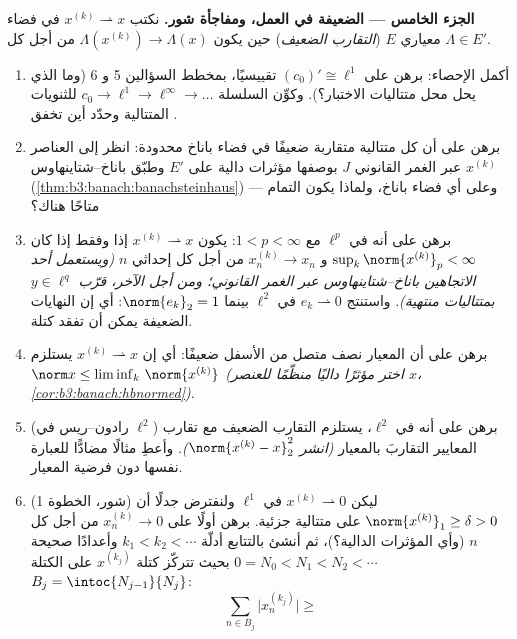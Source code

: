 \begin{problem}[{مسألة نهاية الأسبوع --- $(\ell^p)' = \ell^q$، والانعكاسية،
وغرابة $\ell^\infty$}]
\medskip
\noindent\textbf{الجزء الخامس ---  الضعيفة في
العمل، ومفاجأة شور.} نكتب $x^{(k)} \rightharpoonup x$ في فضاء معياري $E$
(\emph{التقارب الضعيف}) حين يكون $\Lambda(x^{(k)}) \to \Lambda(x)$ من أجل كل
$\Lambda \in E'$.
\begin{enumerate}[resume]
  \item أكمل الإحصاء: برهن على $(c_0)' \cong \ell^1$ تقييسيًا، بمخطط
        السؤالين 5 و 6 (وما الذي يحل محل متتاليات الاختبار؟).
        وكوِّن السلسلة $c_0 \to \ell^1 \to \ell^\infty \to \dots$ للثنويات المتتالية وحدّد أين
        تخفق .
  \item برهن على أن كل متتالية متقاربة ضعيفًا في فضاء باناخ
        محدودة: انظر إلى العناصر $x^{(k)}$ عبر الغمر القانوني
        $J$ بوصفها مؤثرات دالية على $E'$ وطبّق
        باناخ--شتاينهاوس (\cref{thm:b3:banach:banachsteinhaus}) --- وعلى أي فضاء باناخ،
        ولماذا يكون التمام متاحًا هناك؟
  \item برهن على أنه في $\ell^p$ مع $1 < p < \infty$: يكون
        $x^{(k)}
        \rightharpoonup x$ إذا وفقط إذا كان $\sup_k\norm{x^{(k)}}_p <
        \infty$ و $x^{(k)}_n \to x_n$ من أجل كل
        إحداثي $n$ \emph{(ويستعمل أحد الاتجاهين
        باناخ--شتاينهاوس عبر الغمر القانوني؛ ومن أجل الآخر،
        قرّب $y
        \in \ell^q$ بمتتاليات منتهية)}. واستنتج $e_k
        \rightharpoonup 0$ في
        $\ell^2$ بينما $\norm{e_k}_2 =
        1$: أي إن النهايات الضعيفة يمكن أن
        تفقد كتلة.
  \item برهن على أن المعيار نصف متصل من الأسفل ضعيفًا: أي إن
        $x^{(k)} \rightharpoonup x$ يستلزم $\norm x \leq
        \liminf_k\,\norm{x^{(k)}}$ \emph{(اختر مؤثرًا داليًا منظّمًا
        للعنصر $x$، \cref{cor:b3:banach:hbnormed})}.
  \item (رادون--ريس في $\ell^2$) برهن على أنه في $\ell^2$، يستلزم
        التقارب الضعيف مع تقارب المعايير التقاربَ بالمعيار
        \emph{(انشر $\norm{x^{(k)} -
        x}_2^2$)}. وأعطِ مثالًا مضادًّا للعبارة
        نفسها دون فرضية المعيار.
  \item (شور، الخطوة 1) ليكن $x^{(k)} \rightharpoonup 0$ في $\ell^1$ ولنفترض جدلًا
        أن $\norm{x^{(k)}}_1 \geq \delta > 0$ على متتالية جزئية. برهن أولًا على $x^{(k)}_n \to 0$ من
        أجل كل $n$ (وأي المؤثرات الدالية؟)، ثم أنشئ بالتتابع
        أدلّة $k_1 < k_2 < \cdots$ وأعدادًا صحيحة $0 = N_0 < N_1 < N_2 < \cdots$ بحيث تتركّز كتلة
        $x^{(k_j)}$ على الكتلة $B_j =
        \intoc{N_{j-1}}{N_j}$:
        \[
        \sum_{n \in B_j}\bigl|x^{(k_j)}_n\bigr| \geq
\]
\end{enumerate}
\end{problem}
